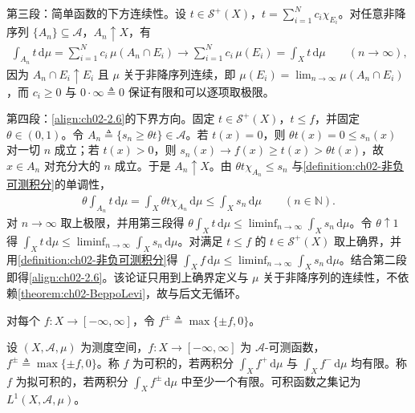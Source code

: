 \documentclass[../../main.tex]{subfiles}%
\begin{document}
\begin{remark}
第三段：简单函数的下方连续性。设 $t\in\mathscr S^+(X)$，$t=\sum_{i=1}^Nc_i\chi_{E_i}$。对任意非降序列 $\{A_n\}\subseteq\mathscr A$，$A_n\uparrow X$，有
\begin{align*}
\int_{A_n}t\,\mathrm{d}\mu=\sum_{i=1}^Nc_i\,\mu(A_n\cap E_i)\longrightarrow\sum_{i=1}^Nc_i\,\mu(E_i)=\int_Xt\,\mathrm{d}\mu\qquad(n\to\infty),
\end{align*}
因为 $A_n\cap E_i\uparrow E_i$ 且 $\mu$ 关于非降序列连续，即 $\mu(E_i)=\lim_{n\to\infty}\mu(A_n\cap E_i)$，而 $c_i\geqslant0$ 与 $0\cdot\infty\triangleq0$ 保证有限和可以逐项取极限。

第四段：\eqref{align:ch02-2.6}的下界方向。固定 $t\in\mathscr S^+(X)$，$t\leqslant f$，并固定 $\theta\in(0,1)$。令 $A_n\triangleq\{s_n\geqslant\theta t\}\in\mathscr A$。若 $t(x)=0$，则 $\theta t(x)=0\leqslant s_n(x)$ 对一切 $n$ 成立；若 $t(x)>0$，则 $s_n(x)\to f(x)\geqslant t(x)>\theta t(x)$，故 $x\in A_n$ 对充分大的 $n$ 成立。于是 $A_n\uparrow X$。由 $\theta t\chi_{A_n}\leqslant s_n$ 与\cref{definition:ch02-非负可测积分}的单调性，
\begin{align*}
\theta\int_{A_n}t\,\mathrm{d}\mu=\int_X\theta t\chi_{A_n}\,\mathrm{d}\mu\leqslant\int_Xs_n\,\mathrm{d}\mu\qquad(n\in\mathbb N).
\end{align*}
对 $n\to\infty$ 取上极限，并用第三段得 $\theta\int_Xt\,\mathrm{d}\mu\leqslant\liminf_{n\to\infty}\int_Xs_n\,\mathrm{d}\mu$。令 $\theta\uparrow1$ 得 $\int_Xt\,\mathrm{d}\mu\leqslant\liminf_{n\to\infty}\int_Xs_n\,\mathrm{d}\mu$。对满足 $t\leqslant f$ 的 $t\in\mathscr S^+(X)$ 取上确界，并用\cref{definition:ch02-非负可测积分}得 $\int_Xf\,\mathrm{d}\mu\leqslant\liminf_{n\to\infty}\int_Xs_n\,\mathrm{d}\mu$。结合第二段即得\eqref{align:ch02-2.6}。该论证只用到上确界定义与 $\mu$ 关于非降序列的连续性，不依赖\cref{theorem:ch02-BeppoLevi}，故与后文无循环。
\end{remark}

对每个 $f:X\to[-\infty,\infty]$，令 $f^\pm\triangleq\max\{\pm f,0\}$。

\begin{definition}\label{definition:ch02-可积拟可积}
设 $(X,\mathscr A,\mu)$ 为测度空间，$f:X\to[-\infty,\infty]$ 为 $\mathscr A$-可测函数，$f^\pm\triangleq\max\{\pm f,0\}$。称 $f$ 为可积的，若两积分 $\int_Xf^+\,\mathrm{d}\mu$ 与 $\int_Xf^-\,\mathrm{d}\mu$ 均有限。称 $f$ 为拟可积的，若两积分 $\int_Xf^\pm\,\mathrm{d}\mu$ 中至少一个有限。可积函数之集记为 $L^1(X,\mathscr A,\mu)$。
\end{definition}
\end{document}
